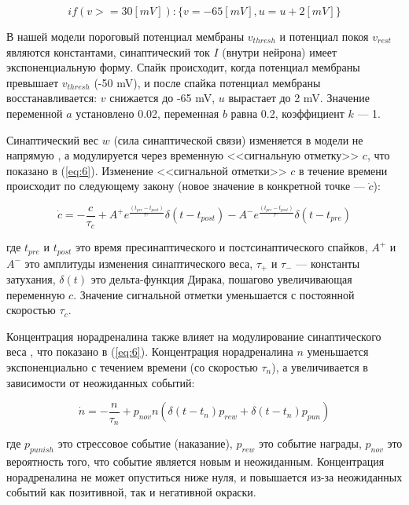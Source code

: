 \begin{equation}\label{eq:3}
if (v >= 30 [mV]) : \{v = - 65 [mV], u = u + 2 [mV]\}
\end{equation}


В нашей модели пороговый потенциал мембраны $v_{thresh}$ и потенциал покоя $v_{rest}$ являются константами, синаптический ток $I$ (внутри нейрона) имеет экспоненциальную форму. Спайк происходит, когда потенциал мембраны превышает $v_{thresh}$ (-50 mV), и после спайка потенциал мембраны восстанавливается: $v$ снижается до -65 mV, $u$ вырастает до 2 mV. Значение переменной $a$ установлено 0.02, переменная $b$ равна 0.2, коэффициент $k$ --- 1.


Синаптический вес $w$ (сила синаптической связи) изменяется в модели не напрямую \cite{stdp}, а модулируется через временную <<сигнальную отметку>> $c$, что показано в (\ref{eq:6}). Изменение <<сигнальной отметки>> $c$ в течение времени происходит по следующему закону (новое значение в конкретной точке --- $\dot{c}$):


\begin{equation}\label{eq:4}
\dot{c} =  -\frac{c}{\tau_c} + A^+e^{\frac{(t_{pre} - t_{post})}{\tau^+}}\delta(t - t_{post})  -A^-e^{  \frac{(t_{pre} - t_{post})}{\tau^-}}\delta(t - t_{pre} )
\end{equation}


где $t_{pre}$ и $t_{post}$ это время пресинаптического и постсинаптического спайков, $A^+$ и $A^-$ это амплитуды изменения синаптического веса, $\tau_+$ и $\tau_-$ --- константы затухания, $\delta(t)$ это дельта-функция Дирака, пошагово увеличивающая переменную $c$. Значение сигнальной отметки уменьшается с постоянной скоростью $\tau_c$. 


Концентрация норадреналина также влияет на модулирование синаптического веса \cite{nora1}\cite{nora2}, что показано в (\ref{eq:6}). Концентрация норадреналина $n$ уменьшается экспоненциально с течением времени (со скоростью $\tau_n$), а увеличивается в зависимости от неожиданных событий:


\begin{equation}\label{eq:5}
\dot{n} = -\frac{n}{\tau_n} + p_{nov}n (\delta(t - t_n)p_{rew} + \delta(t - t_n)p_{pun})
\end{equation}


где $p_{punish}$ это стрессовое событие (наказание), $p_{rew}$ это событие награды, $p_{nov}$ это вероятность того, что событие является новым и неожиданным. Концентрация норадреналина не может опуститься ниже нуля, и повышается из-за неожиданных событий как позитивной, так и негативной окраски.



